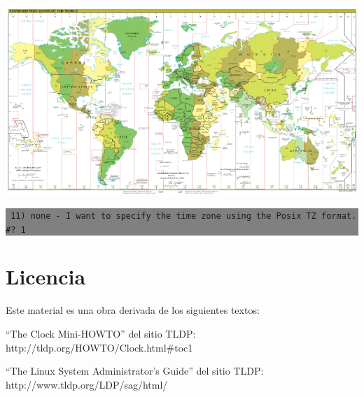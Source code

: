 \documentclass[12pt]{article}
\begin{document}
\begin{center}
 \includegraphics{World_Time_Zones_Map.jpg}
\end{center}

\colorbox{grey}{\parbox[t]{0.95\linewidth}{ \vspace*{0.5cm} { 
{\tt 
11) none - I want to specify the time zone using the Posix TZ format.\\
\#? 1\\
}
} \vspace*{0.5cm} } } 




\section*{Licencia}

Este material es una obra derivada de los siguientes textos:

``The Clock Mini-HOWTO'' del sitio TLDP: http://tldp.org/HOWTO/Clock.html\#toc1

``The Linux System Administrator's Guide'' del sitio TLDP: http://www.tldp.org/LDP/sag/html/
\end{document}
